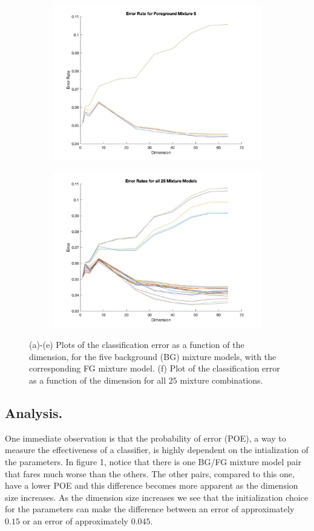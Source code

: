 \documentclass[10pt]{article}
\begin{document}
\begin{figure}[H]
\begin{subfigure}{0.5\textwidth}
		\includegraphics[scale=0.20]{part1_mix5.jpg}
		\caption{}
	\end{subfigure}
	\begin{subfigure}{0.5\textwidth}
		\centering 
		\includegraphics[scale=0.20]{part1_totalerror.jpg}
		\caption{}
	\end{subfigure}
	\caption{(a)-(e) Plots of the classification error as a function of the dimension, for the five background (BG) mixture models, with the corresponding FG mixture model. (f) Plot of the classification error as a function of the dimension for all $25$ mixture combinations.}
\end{figure}
\subsection{Analysis.}
One immediate observation is that the probability of error (POE), a way to measure the effectiveness of a classifier, is highly dependent on the intialization of the parameters. In figure 1, notice that there is one BG/FG mixture model pair that fares much worse than the others. The other pairs, compared to this one, have a lower POE and this difference becomes more apparent as the dimension size increases. As the dimension size increases we see that the initialization choice for the parameters can make the difference between an error of approximately $0.15$ or an error of approximately $0.045$. 
\end{document}
